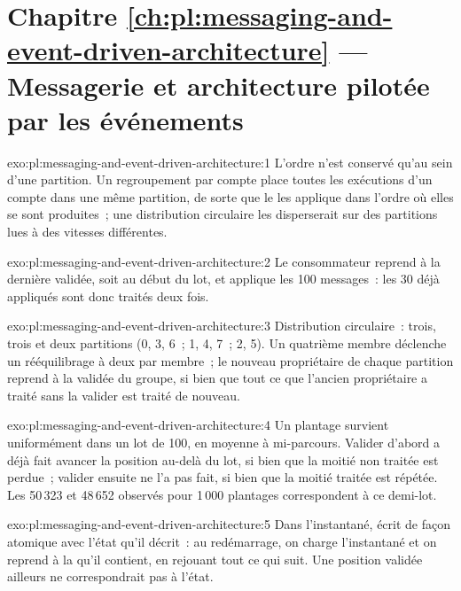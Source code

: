 \section*{Chapitre \ref{ch:pl:messaging-and-event-driven-architecture} --- Messagerie et architecture pilotée par les événements}

\begin{solution}{exo:pl:messaging-and-event-driven-architecture:1}
L'ordre n'est conservé qu'au sein d'une partition. Un regroupement par compte place toutes les exécutions d'un compte dans une même partition, de sorte que le  les applique
dans l'ordre où elles se sont produites~; une distribution circulaire les disperserait sur des partitions lues à des vitesses différentes.
\end{solution}

\begin{solution}{exo:pl:messaging-and-event-driven-architecture:2}
Le consommateur reprend à la dernière  validée, soit au début du lot, et applique les 100 messages~: les 30 déjà appliqués sont donc traités deux fois.
\end{solution}

\begin{solution}{exo:pl:messaging-and-event-driven-architecture:3}
Distribution circulaire~: trois, trois et deux partitions (0, 3, 6~; 1, 4, 7~; 2, 5). Un quatrième membre déclenche un rééquilibrage à deux par membre~; le nouveau
propriétaire de chaque partition reprend à la  validée du groupe, si bien que tout ce que l'ancien propriétaire a traité sans la valider est traité de nouveau.
\end{solution}

\begin{solution}{exo:pl:messaging-and-event-driven-architecture:4}
Un plantage survient uniformément dans un lot de 100, en moyenne à mi-parcours. Valider d'abord a déjà fait avancer la position au-delà du lot, si bien que la
moitié non traitée est perdue~; valider ensuite ne l'a pas fait, si bien que la moitié traitée est répétée. Les 50\,323 et 48\,652 observés pour 1\,000 plantages
correspondent à ce demi-lot.
\end{solution}

\begin{solution}{exo:pl:messaging-and-event-driven-architecture:5}
Dans l'instantané, écrit de façon atomique avec l'état qu'il décrit~: au redémarrage, on charge l'instantané et on reprend à la  qu'il contient,
en rejouant tout ce qui suit. Une position validée ailleurs ne correspondrait pas à l'état.
\end{solution}

